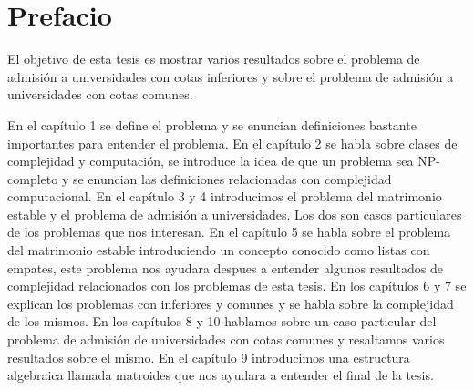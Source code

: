 \documentclass[11pt, oneside]{book}
\begin{document}



\chapter*{Prefacio}

\pagestyle{plain}

El objetivo de esta tesis es mostrar varios resultados sobre el problema de admisión a universidades con cotas inferiores y sobre el problema de admisión a universidades con cotas comunes. 

En el capítulo 1 se define el problema y se enuncian definiciones bastante importantes para entender el problema. 
En el capítulo 2 se habla sobre clases de complejidad y computación, se introduce la idea de que un problema sea NP-completo y se enuncian las definiciones relacionadas con complejidad computacional.
En el capítulo 3 y 4  introducimos el problema del matrimonio estable y el problema de admisión a universidades. Los dos son casos particulares de los problemas que nos interesan. 
En el capítulo 5 se habla sobre el problema del matrimonio estable introduciendo un concepto conocido como listas con empates, este problema nos ayudara despues a entender algunos resultados de complejidad relacionados con los problemas de esta tesis. 
En los capítulos 6 y 7 se explican los problemas con inferiores y comunes y se habla sobre la complejidad de los mismos. 
En los capítulos 8 y 10 hablamos sobre un caso particular del problema de admisión de universidades con cotas comunes y resaltamos varios resultados sobre el mismo. 
En el capítulo 9 introducimos una estructura algebraica llamada matroides que nos ayudara a entender el final de la tesis. 
\end{document}
